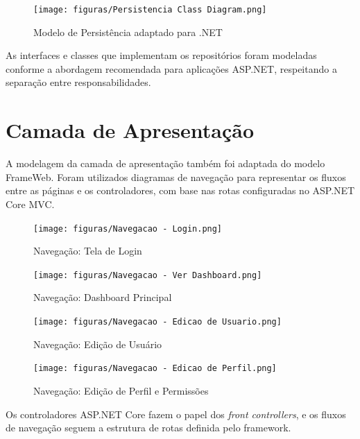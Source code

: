 \begin{figure}[H]
	\centering
	\texttt{[image: figuras/Persistencia Class Diagram.png]}
	\caption{Modelo de Persistência adaptado para .NET}
	\label{fig:modelo-persistencia}
\end{figure}

As interfaces e classes que implementam os repositórios foram modeladas conforme a abordagem recomendada para aplicações ASP.NET, respeitando a separação entre responsabilidades.

\section{Camada de Apresentação}
\label{sec-frameweb-apresentacao}

A modelagem da camada de apresentação também foi adaptada do modelo FrameWeb. Foram utilizados diagramas de navegação para representar os fluxos entre as páginas e os controladores, com base nas rotas configuradas no ASP.NET Core MVC.

\begin{figure}[H]
	\centering
	\texttt{[image: figuras/Navegacao - Login.png]}
	\caption{Navegação: Tela de Login}
	\label{fig:navegacao-login}
\end{figure}

\begin{figure}[H]
	\centering
	\texttt{[image: figuras/Navegacao - Ver Dashboard.png]}
	\caption{Navegação: Dashboard Principal}
	\label{fig:navegacao-dashboard}
\end{figure}

\begin{figure}[H]
	\centering
	\texttt{[image: figuras/Navegacao - Edicao de Usuario.png]}
	\caption{Navegação: Edição de Usuário}
	\label{fig:navegacao-edicao-usuario}
\end{figure}

\begin{figure}[H]
	\centering
	\texttt{[image: figuras/Navegacao - Edicao de Perfil.png]}
	\caption{Navegação: Edição de Perfil e Permissões}
	\label{fig:navegacao-edicao-perfil}
\end{figure}

Os controladores ASP.NET Core fazem o papel dos \textit{front controllers}, e os fluxos de navegação seguem a estrutura de rotas definida pelo framework.
